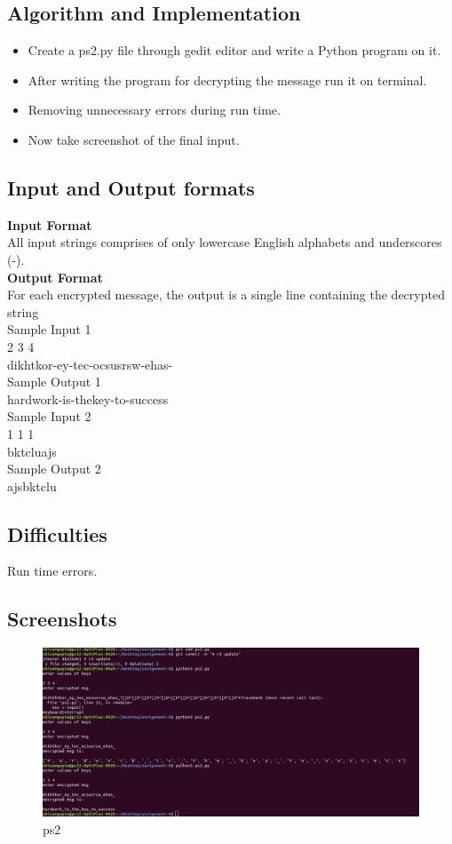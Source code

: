 \documentclass[a4paper,12pt]{article}
\begin{document}
\begin{flushleft}
\subsection{Algorithm and Implementation}
\begin{itemize}
\item Create a ps2.py file through gedit editor and write a Python program on it.
\item After writing the program for decrypting the message run it on terminal.
\item Removing unnecessary errors during run time.
\item Now take screenshot of the final input.
\end{itemize}
\subsection{Input and Output formats}
\textbf{Input Format} \\
All input strings comprises of only lowercase English alphabets and underscores (-).\\
\textbf{Output Format} \\
For each encrypted message, the output is a single line containing the decrypted string\\
Sample Input 1\\
2 3 4\\
dikhtkor-ey-tec-ocsusrsw-ehas-\\

Sample Output 1\\
hardwork-is-thekey-to-success\\
Sample Input 2\\
1 1 1\\
bktcluajs\\

Sample Output 2\\
ajsbktclu\\




\subsection{Difficulties}
Run time errors.
\subsection{Screenshots}
\begin{figure}
\includegraphics[scale=0.5]{ps2.png}
\caption{ps2}
\end{figure}
\newpage
\nocite{*}


\end{flushleft}
\end{document}
